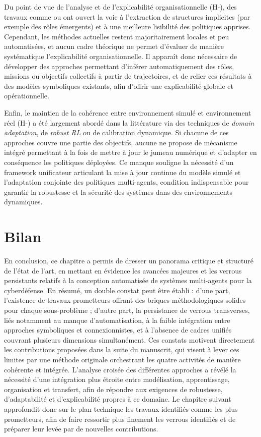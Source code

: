 Du point de vue de l’analyse et de l’explicabilité organisationnelle (H-), des travaux comme  ou  ont ouvert la voie à l’extraction de structures implicites (par exemple des rôles émergents) et à une meilleure lisibilité des politiques apprises. Cependant, les méthodes actuelles restent majoritairement locales et peu automatisées, et aucun cadre théorique ne permet d’évaluer de manière systématique l’explicabilité organisationnelle. Il apparaît donc nécessaire de développer des approches permettant d’inférer automatiquement des rôles, missions ou objectifs collectifs à partir de trajectoires, et de relier ces résultats à des modèles symboliques existants, afin d’offrir une explicabilité globale et opérationnelle.

Enfin, le maintien de la cohérence entre environnement simulé et environnement réel (H-) a été largement abordé dans la littérature via des techniques de \textit{domain adaptation}, de \textit{robust RL} ou de calibration dynamique. Si chacune de ces approches couvre une partie des objectifs, aucune ne propose de mécanisme intégré permettant à la fois de mettre à jour le jumeau numérique et d’adapter en conséquence les politiques déployées. Ce manque souligne la nécessité d’un framework unificateur articulant la mise à jour continue du modèle simulé et l’adaptation conjointe des politiques multi-agents, condition indispensable pour garantir la robustesse et la sécurité des systèmes dans des environnements dynamiques.



\section*{Bilan}
\noindent En conclusion, ce chapitre a permis de dresser un panorama critique et structuré de l’état de l’art, en mettant en évidence les avancées majeures et les verrous persistants relatifs à la conception automatisée de systèmes multi-agents pour la cyberdéfense. En résumé, un double constat peut être établi : d’une part, l’existence de travaux prometteurs offrant des briques méthodologiques solides pour chaque sous-problème ; d’autre part, la persistance de verrous transverses, liés notamment au manque d’automatisation, à la faible intégration entre approches symboliques et connexionnistes, et à l’absence de cadres unifiés couvrant plusieurs dimensions simultanément. Ces constats motivent directement les contributions proposées dans la suite du manuscrit, qui visent à lever ces limites par une méthode originale orchestrant les quatre activités de manière cohérente et intégrée. L’analyse croisée des différentes approches a révélé la nécessité d’une intégration plus étroite entre modélisation, apprentissage, organisation et transfert, afin de répondre aux exigences de robustesse, d’adaptabilité et d’explicabilité propres à ce domaine. Le chapitre suivant approfondit donc sur le plan technique les travaux identifiés comme les plus prometteurs, afin de faire ressortir plus finement les verrous identifiés et de préparer leur levée par de nouvelles contributions.

